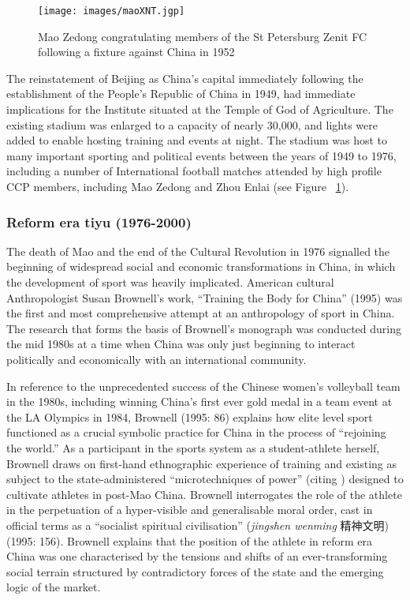 {\begin{figure}[htbp]
  \texttt{[image: images/maoXNT.jgp]}
  \caption{Mao Zedong congratulating members of the St Petersburg Zenit FC following a fixture against China in 1952}
  \label{fig:maoXNT}
\end{figure}

The reinstatement of Beijing as China's capital immediately following the establishment of the People's Republic of China in 1949, had immediate implications for the Institute situated at the Temple of God of Agriculture.  The existing stadium was enlarged to a capacity of nearly 30,000, and lights were added to enable hosting training and events at night.  The stadium was host to many important sporting and political events between the years of 1949 to 1976, including a number of International football matches attended by high profile CCP members, including Mao Zedong and Zhou Enlai (see Figure ~\ref{fig:maoXNT}).


\subsubsection{Reform era tiyu (1976-2000)}
The death of Mao and the end of the Cultural Revolution in 1976 signalled the beginning of widespread social and economic transformations in China, in which the development of sport was heavily implicated.  American cultural Anthropologist Susan Brownell’s work, ``Training the Body for China'' (1995) was the first and most comprehensive attempt at an anthropology of sport in China. The research that forms the basis of Brownell's monograph was conducted during the mid 1980s at a time when China was only just beginning to interact politically and economically with an international community.

In reference to the unprecedented success of the Chinese women’s volleyball team in the 1980s, including winning China's first ever gold medal in a team event at the LA Olympics in 1984, Brownell (1995: 86) explains how elite level sport functioned as a crucial symbolic practice for China in the process of ``rejoining the world.''  As a participant in the sports system as a student-athlete herself, Brownell draws on first-hand ethnographic experience of training and existing as subject to the state-administered ``microtechniques of power'' (citing \cite{Foucault1977}) designed to cultivate athletes in post-Mao China.  Brownell interrogates the role of the athlete in the perpetuation of a hyper-visible and generalisable moral order, cast in official terms as a ``socialist spiritual civilisation'' (\textit{jingshen wenming} 精神文明) (1995: 156).  Brownell explains that the position of the athlete in reform era China was one characterised by the tensions and shifts of an ever-transforming social terrain structured by contradictory forces of the state and the emerging logic of the market.

}
